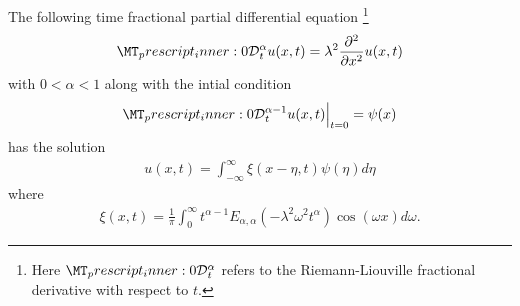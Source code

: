 \begin{mdframed}[innertopmargin=10pt]
\begin{proposition}
    \label{prop:nig_frac}
    The following time fractional partial differential equation \footnote{Here $ \prescript{}{0}{\mathcal{D}}^\alpha_t $ refers to the Riemann-Liouville fractional derivative with respect to $ t $.}
    \begin{align}
        \label{eq:nig_frac}
        \prescript{}{0}{\mathcal{D}}^\alpha_t u(x,t) = \lambda^2 \frac{\partial^2}{\partial x^2}u(x,t)
    \end{align}
    with $ 0 < \alpha < 1 $ along with the intial condition
    \begin{align}
        \prescript{}{0}{\mathcal{D}}^{\alpha-1}_t u(x,t) \Big|_{t=0} = \psi(x)
    \end{align}
    has the solution
    \begin{align}
        u(x,t) = \int_{-\infty}^\infty \xi(x - \eta, t) \psi(\eta) d\eta
    \end{align}
    where
    \begin{align}
        \xi(x,t) = \frac{1}{\pi} \int_0^\infty t^{\alpha - 1} E_{\alpha, \alpha}(-\lambda^2\omega^2t^\alpha)\cos(\omega x)d\omega.
    \end{align}
\end{proposition}
\end{mdframed}
